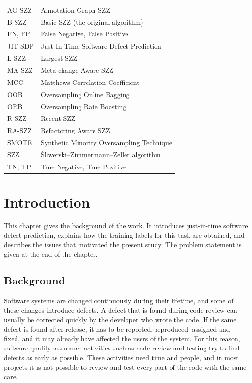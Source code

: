 \documentclass[12pt,a4paper,oneside]{report}
\begin{document}
\begin{tabular}{@{}ll@{}}
AG-SZZ & Annotation Graph SZZ \\
B-SZZ & Basic SZZ (the original algorithm) \\
FN, FP & False Negative, False Positive \\
JIT-SDP & Just-In-Time Software Defect Prediction \\
L-SZZ & Largest SZZ \\
MA-SZZ & Meta-change Aware SZZ \\
MCC & Matthews Correlation Coefficient \\
OOB & Oversampling Online Bagging \\
ORB & Oversampling Rate Boosting \\
R-SZZ & Recent SZZ \\
RA-SZZ & Refactoring Aware SZZ \\
SMOTE & Synthetic Minority Oversampling Technique \\
SZZ & \'{S}liwerski--Zimmermann--Zeller algorithm \\
TN, TP & True Negative, True Positive \\
\end{tabular}

\clearpage
{}
\setcounter{page}{1}

\chapter{Introduction}\label{ch:intro}

This chapter gives the background of the work. It introduces just-in-time
software defect prediction, explains how the training labels for this task are
obtained, and describes the issues that motivated the present study. The
problem statement is given at the end of the chapter.

\section{Background}

Software systems are changed continuously during their lifetime, and some of
these changes introduce defects. A defect that is found during code review can
usually be corrected quickly by the developer who wrote the code. If the same
defect is found after release, it has to be reported, reproduced, assigned and
fixed, and it may already have affected the users of the system. For this
reason, software quality assurance activities such as code review and testing
try to find defects as early as possible. These activities need time and
people, and in most projects it is not possible to review and test every part
of the code with the same care.
\end{document}
